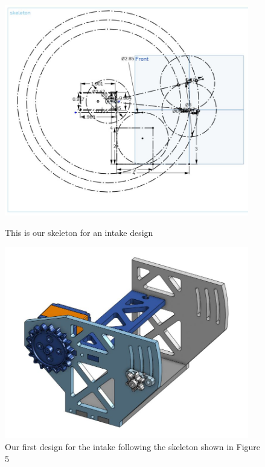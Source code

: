 \begin{figure}[ht]
\centering
\begin{minipage}[b]{.48\textwidth}
  \centering
  \includegraphics[width=0.95\textwidth]{Meetings/August/08-20-21/8-18-21_CAD_Image5 - Nathan Forrer.jpg}
  \caption{This is our skeleton for an intake design}
  \label{fig:082021_5}
\end{minipage}%
\hfill%
\begin{minipage}[b]{.48\textwidth}
  \centering
  \includegraphics[width=0.95\textwidth]{Meetings/August/08-20-21/8-18-21_CAD_Image6 - Nathan Forrer.jpg}
  \caption{Our first design for the intake following the skeleton shown in Figure 5}
  \label{fig:082021_6}
\end{minipage}
\end{figure}

